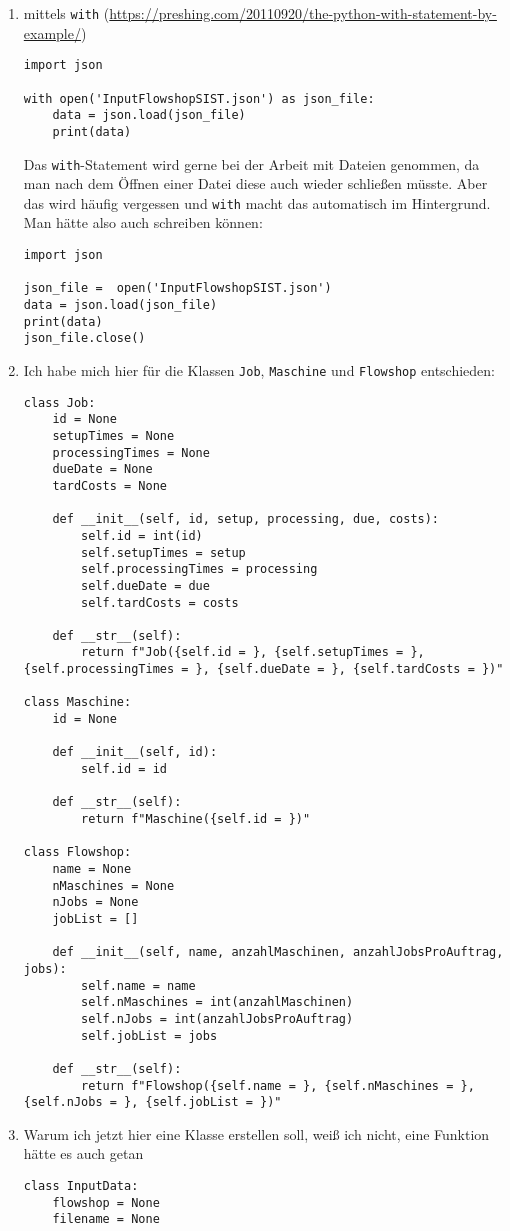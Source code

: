 \documentclass{article}
\begin{document}
	\begin{enumerate}[label=(\alph*)]
		\item mittels \texttt{with} (\url{https://preshing.com/20110920/the-python-with-statement-by-example/})
		\begin{lstlisting}
import json

with open('InputFlowshopSIST.json') as json_file:
	data = json.load(json_file)
	print(data)
		\end{lstlisting}
		Das \texttt{with}-Statement wird gerne bei der Arbeit mit Dateien genommen, da man nach dem Öffnen einer Datei diese auch wieder schließen müsste. Aber das wird häufig vergessen und \texttt{with} macht das automatisch im Hintergrund. Man hätte also auch schreiben können:
		\begin{lstlisting}
import json
			
json_file =  open('InputFlowshopSIST.json')
data = json.load(json_file)
print(data)
json_file.close()
		\end{lstlisting}
		\item Ich habe mich hier für die Klassen \texttt{Job}, \texttt{Maschine} und \texttt{Flowshop} entschieden:
		\begin{lstlisting}
class Job:
	id = None
	setupTimes = None
	processingTimes = None
	dueDate = None
	tardCosts = None

	def __init__(self, id, setup, processing, due, costs):
		self.id = int(id)
		self.setupTimes = setup
		self.processingTimes = processing
		self.dueDate = due
		self.tardCosts = costs

	def __str__(self):
		return f"Job({self.id = }, {self.setupTimes = }, {self.processingTimes = }, {self.dueDate = }, {self.tardCosts = })"

class Maschine:
	id = None

	def __init__(self, id):
		self.id = id

	def __str__(self):
		return f"Maschine({self.id = })"

class Flowshop:
	name = None
	nMaschines = None
	nJobs = None
	jobList = []

	def __init__(self, name, anzahlMaschinen, anzahlJobsProAuftrag, jobs):
		self.name = name
		self.nMaschines = int(anzahlMaschinen)
		self.nJobs = int(anzahlJobsProAuftrag)
		self.jobList = jobs

	def __str__(self):
		return f"Flowshop({self.name = }, {self.nMaschines = }, {self.nJobs = }, {self.jobList = })"
		\end{lstlisting}
		\item Warum ich jetzt hier eine Klasse erstellen soll, weiß ich nicht, eine Funktion hätte es auch getan
		\begin{lstlisting}
class InputData:
	flowshop = None
	filename = None


\end{lstlisting}
\end{enumerate}
\end{document}
